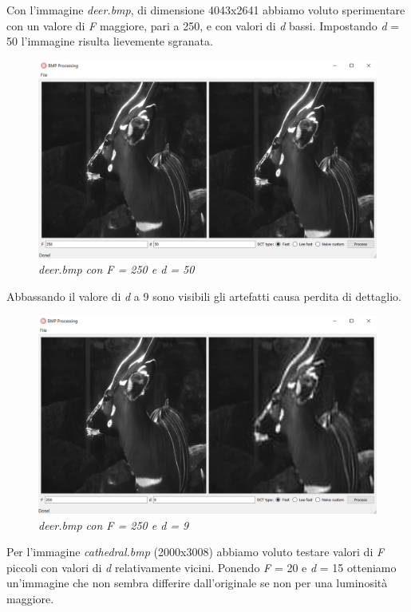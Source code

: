 \documentclass[a4paper,12pt]{report}
\begin{document}
\noindent Con l'immagine \textit{deer.bmp}, di dimensione 4043x2641 abbiamo voluto sperimentare con un valore di \textit{F} maggiore, pari a 250, e con valori di \textit{d} bassi.
Impostando \textit{d} = 50 l'immagine risulta lievemente sgranata.

\begin{figure}[H]
\centering
\includegraphics[width=0.8\linewidth]{../img/bambi_250_50.png}
\caption{\textit{deer.bmp con F = 250 e d = 50}}
\end{figure}

\noindent Abbassando il valore di \textit{d} a 9 sono visibili gli artefatti causa perdita di dettaglio.

\begin{figure}[H]
\centering
\includegraphics[width=0.8\linewidth]{../img/bambi_250_9.png}
\caption{\textit{deer.bmp con F = 250 e d = 9}}
\end{figure}

\newpage
\noindent Per l'immagine \textit{cathedral.bmp} (2000x3008) abbiamo voluto testare valori di \textit{F} piccoli con valori di \textit{d} relativamente vicini.
Ponendo \textit{F} = 20 e \textit{d} = 15 otteniamo un'immagine che non sembra differire dall'originale se non per una luminosità maggiore.
\end{document}
